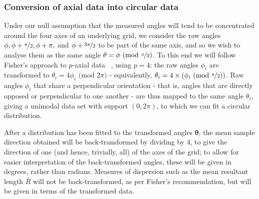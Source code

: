 \documentclass[../../ArchStats.tex]{subfiles}
\begin{document}
\subsubsection{Conversion of axial data into circular data}
Under our null assumption that the measured angles will tend to be concentrated around the four axes of an underlying grid, we consider the raw angles $\phi, \phi + \nicefrac{\pi}{2}, \phi + \pi,$ and $\phi + \nicefrac{3\pi}{2}$ to be part of the same axis, and so we wish to analyse them as the same angle $\theta = \phi \text{ (mod }\nicefrac{\pi}{2})$.
To this end we will follow Fisher's approach to $p$-axial data ~\cite{Fisher1993}, using $p=4$: the raw angles $\phi_i$ are transformed to $\theta_i = 4\phi_i \text{ (mod } 2\pi)$ - equivalently, $\theta_i = 4 \times \left( \phi_i \text{ (mod }\nicefrac{\pi}{2})\right)$. Raw angles $\phi_i$ that share a perpendicular orientation - that is, angles that are directly opposed or perpendicular to one another - are thus mapped to the same angle $\theta_i$,  giving a unimodal data set with support $(0, 2\pi)$, to which we can fit a circular distribution.


 
After a distribution has been fitted to the transformed angles $\mathbf{\theta}$, the mean sample direction obtained will be back-transformed by dividing by 4, to give the direction of one (and hence, trivially, all) of the axes of the grid; to allow for easier interpretation of the back-transformed angles, these will be given in degrees, rather than radians. Measures of dispersion such as the mean resultant length $\bar{R}$ will not be back-transformed, as per Fisher's recommendation, but will be given in terms of the transformed data.

\end{document}
